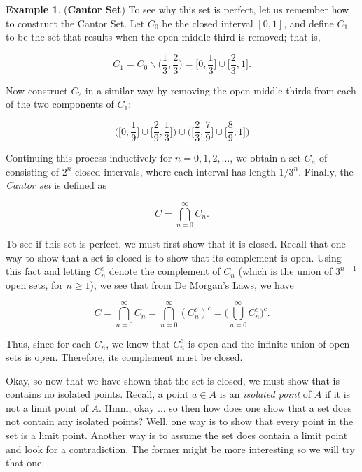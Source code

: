 \documentclass{article}
\theoremstyle{definition}
\theoremstyle{remark}
\theoremstyle{definition}
\newtheorem{example}{Example}[section]
\begin{document}
\begin{example}
    (\textbf{Cantor Set}) To see why this set is perfect, let us remember how to construct the Cantor Set. Let $C_0$ be the closed interval $[0,1]$, and define $C_1$ to be the set that results when the open middle third is removed; that is, 
    
    \begin{equation*}
        C_1=C_0\backslash\bigg(\frac{1}{3},\frac{2}{3}\bigg)=\bigg[0,\frac{1}{3}\bigg]\cup\bigg[\frac{2}{3},1\bigg].
    \end{equation*}
    
    \noindent Now construct $C_2$ in a similar way by removing the open middle thirds from each of the two components of $C_1$:
    
        \begin{equation*}
            \bigg(\bigg[0,\frac{1}{9}\bigg]\cup\bigg[\frac{2}{9},\frac{1}{3}\bigg]\bigg)\cup\bigg(\bigg[\frac{2}{3}, \frac{7}{9}\bigg]\cup\bigg[\frac{8}{9},1\bigg]\bigg)
        \end{equation*}
        
    \noindent Continuing this process inductively for $n=0,1,2,\dots$, we obtain a set $C_n$ of consisting of $2^n$ closed intervals, where each interval has length $1/3^n$. Finally, the \textit{Cantor set} is defined as
    
    \begin{equation*}
        C=\bigcap_{n=0}^{\infty}C_n.
    \end{equation*}
    
    \newpage
    
    \noindent To see if this set is perfect, we must first show that it is closed. Recall that one way to show that a set is closed is to show that its complement is open. Using this fact and letting $C_n^c$ denote the complement of $C_n$ (which is the union of $3^{n-1}$ open sets, for $n\geq 1$), we see that from De Morgan's Laws, we have
    
    \begin{equation*}
        C=\bigcap_{n=0}^{\infty}C_n=\bigcap_{n=0}^{\infty}(C_n^c)^c=\bigg(\bigcup_{n=0}^{\infty}C_n^c\bigg)^c.
    \end{equation*}
    
    \noindent Thus, since for each $C_n$, we know that $C_n^c$ is open and the infinite union of open sets is open. Therefore, its complement must be closed.\par 
    Okay, so now that we have shown that the set is closed, we must show that is contains no isolated points. Recall, a point $a\in A$ is an \textit{isolated point} of $A$ if it is not a limit point of $A$. Hmm, okay ... so then how does one show that a set does not contain any isolated points? Well, one way is to show that every point in the set is a limit point. Another way is to assume the set does contain a limit point and look for a contradiction. The former might be more interesting so we will try that one.
    
\end{example}
\end{document}
